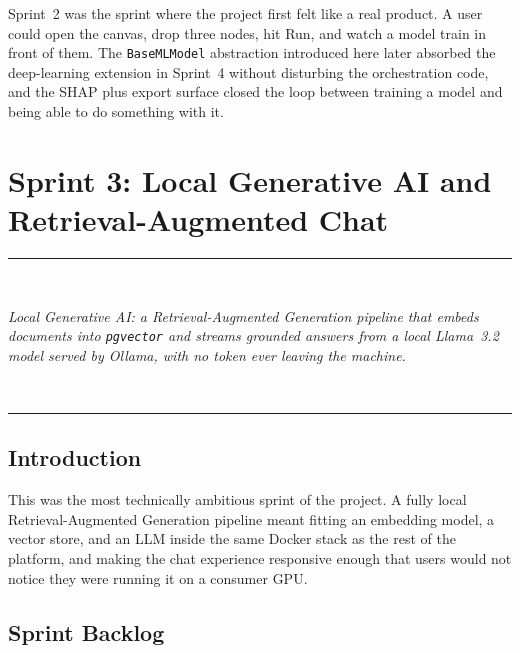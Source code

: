 \documentclass[12pt, a4paper, oneside]{report}
\newcommand{\chapterabstract}[1]{%
  \vspace*{1.2cm}%
  \begin{center}%
  \rule{0.45\textwidth}{0.4pt}\\[0.8em]%
  \begin{minipage}{0.82\textwidth}\centering\itshape\large #1\end{minipage}\\[0.8em]%
  \rule{0.45\textwidth}{0.4pt}%
  \end{center}%
  \vspace*{\fill}\clearpage}
\begin{document}
Sprint~2 was the sprint where the project first felt like a real
product. A user could open the canvas, drop three nodes, hit Run,
and watch a model train in front of them. The \texttt{BaseMLModel}
abstraction introduced here later absorbed the deep-learning
extension in Sprint~4 without disturbing the orchestration code, and
the SHAP plus export surface closed the loop between training a
model and being able to do something with it.

\chapter{Sprint 3: Local Generative AI and Retrieval-Augmented Chat}
\chapterabstract{Local Generative AI: a Retrieval-Augmented Generation pipeline
that embeds documents into \texttt{pgvector} and streams grounded answers from a
local Llama~3.2 model served by Ollama, with no token ever leaving the machine.}

\section*{Introduction}

This was the most technically ambitious sprint of the project. A
fully local Retrieval-Augmented Generation pipeline meant fitting an
embedding model, a vector store, and an LLM inside the same Docker
stack as the rest of the platform, and making the chat experience
responsive enough that users would not notice they were running it
on a consumer GPU.

\section{Sprint Backlog}
\end{document}
